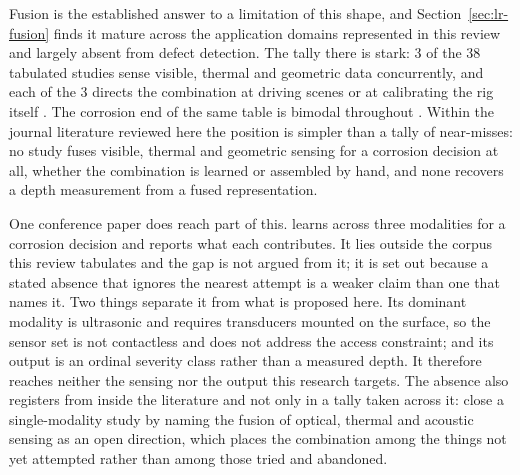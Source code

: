 Fusion is the established answer to a limitation of this shape, and
Section~\ref{sec:lr-fusion} finds it mature across the application domains
represented in this review and largely absent from defect detection. The tally
there is stark: 3 of the 38 tabulated studies sense visible, thermal and
geometric data concurrently, and each of the 3 directs the combination at
driving scenes or at calibrating the rig itself \citep{Tran2025,Yang2024,Tran2024}. The
corrosion end of the same table is bimodal throughout
\citep{Lim2021,PimenteldeFigueiredo2025}. Within the journal
literature reviewed here the position is simpler than a tally of near-misses: no
study fuses visible, thermal and geometric sensing for a corrosion decision at
all, whether the combination is learned or assembled by hand, and none recovers
a depth measurement from a fused representation.

One conference paper does reach part of this. \citet{Ding2025} learns across
three modalities for a corrosion decision and reports what each contributes. It
lies outside the corpus this review tabulates and the gap is not argued from it;
it is set out because a stated absence that ignores the nearest attempt is a
weaker claim than one that names it. Two things separate it from what is
proposed here. Its dominant modality is ultrasonic and requires transducers
mounted on the surface, so the sensor set is not contactless and does not
address the access constraint; and its output is an ordinal severity class
rather than a measured depth. It therefore reaches neither the sensing nor the
output this research targets. The absence also registers from inside the literature
and not only in a tally taken across it: \citet{Imran2025} close a
single-modality study by naming the fusion of optical, thermal and acoustic
sensing as an open direction, which places the combination among the things not
yet attempted rather than among those tried and abandoned.

